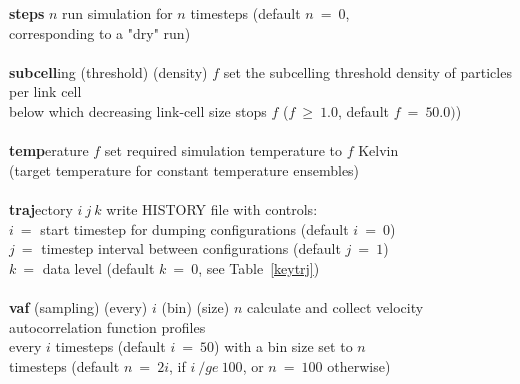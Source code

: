 \begin{tabbing}
\> {\bf steps} $n$                              \> run simulation for $n$ timesteps (default $n~=~0$, \\
\>                                              \> corresponding to a "dry" run) \\
\>                                              \> \\
\> {\bf subcell}ing (threshold) (density) $f$   \> set the subcelling threshold density of particles per link cell \\
\>                                              \> below which decreasing link-cell size stops $f$ ($f~\ge~1.0$, default $f~=~50.0)$) \\
\>                                              \> \\
\> {\bf temp}erature $f$                        \> set required simulation temperature to $f$ Kelvin \\
\>                                              \> (target temperature for constant temperature ensembles) \\
\>                                              \> \\
\> {\bf traj}ectory $i~j~k$                     \> write HISTORY file with controls: \\
\>                                              \> $i~=$ start timestep for dumping configurations (default $i~=~0$) \\
\>                                              \> $j~=$ timestep interval between configurations (default $j~=~1$) \\
\>                                              \> $k~=$ data level (default $k~=~0$, see Table~\ref{keytrj}) \\
\>                                              \> \\
\> {\bf vaf} (sampling) (every) $i$ (bin) (size) $n$ \> \phantom{xxxx} calculate and collect velocity autocorrelation function profiles \\
\>                                                   \> \phantom{xxxx} every $i$ timesteps (default $i~=~50$) with a bin size set to $n$ \\
\>                                                   \> \phantom{xxxx} timesteps (default $n~=~2i$, if $i~/ge~100$, or $n~=~100$ otherwise) \\
\>                                              \> \\
\>                                              \> \\

\end{tabbing}
